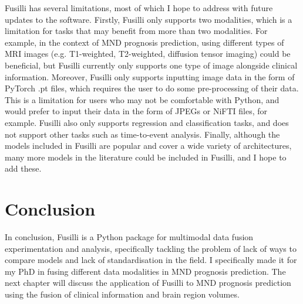Fusilli has several limitations, most of which I hope to address with future updates to the software.
Firstly, Fusilli only supports two modalities, which is a limitation for tasks that may benefit from more than two modalities.
For example, in the context of MND prognosis prediction, using different types of MRI images (e.g. T1-weighted, T2-weighted, diffusion tensor imaging) could be beneficial, but Fusilli currently only supports one type of image alongside clinical information.
Moreover, Fusilli only supports inputting image data in the form of PyTorch .pt files, which requires the user to do some pre-processing of their data.
This is a limitation for users who may not be comfortable with Python, and would prefer to input their data in the form of JPEGs or NiFTI files, for example.
Fusilli also only supports regression and classification tasks, and does not support other tasks such as time-to-event analysis.
Finally, although the models included in Fusilli are popular and cover a wide variety of architectures, many more models in the literature could be included in Fusilli, and I hope to add these.

\section{Conclusion}
In conclusion, Fusilli is a Python package for multimodal data fusion experimentation and analysis, specifically tackling the problem of lack of ways to compare models and lack of standardisation in the field.
I specifically made it for my PhD in fusing different data modalities in MND prognosis prediction.
The next chapter will discuss the application of Fusilli to MND prognosis prediction using the fusion of clinical information and brain region volumes.

